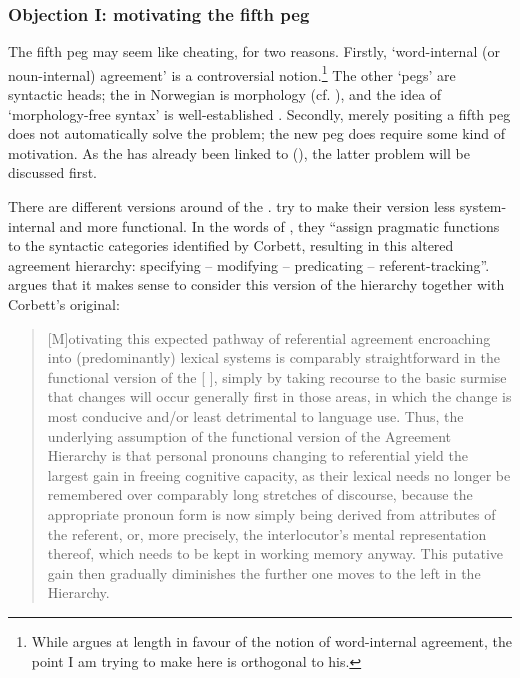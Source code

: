 \documentclass[output=paper]{langsci/langscibook}
\begin{document}
\begin{exe}
\begin{xlist}
\begin{xlist}
\subsubsection{Objection I: motivating the fifth peg}
\label{sec:enger:3.2.2}
\largerpage
The fifth peg may seem like cheating, for two reasons. Firstly,
`word-internal (or noun-internal) agreement' is a controversial
notion.\footnote{While %
\citet{Stolz07} %
%
argues at length in favour of the
  notion of word-internal agreement, the point I am trying to make here
  is orthogonal to his.} The other `pegs' are syntactic heads; the
 in Norwegian is morphology (cf. ), and the idea of
`morphology-free syntax' is well-established %
\citep{Zwicky92,Corbett14}%
%
. Secondly, merely positing a fifth peg does not automatically
solve the problem; the new peg does require some kind of motivation. As
the  has already been linked to 
(), the latter problem will be discussed first.

There are different versions around of the . %
\citet{Kopcke10} %
%
try to make their version less system-internal and more
functional. In the words of %
\citet[18]{Dolberg14}%
%
, they ``assign pragmatic
functions to the syntactic categories identified by Corbett, resulting
in this altered agreement hierarchy: specifying -- modifying --
predicating -- referent-tracking''. %
\citet[58]{Dolberg14} %
%
argues that it
makes sense to consider this version of the hierarchy together with
Corbett's original:

\begin{quote}
[M]otivating this expected pathway of referential agreement encroaching
into (predominantly) lexical  systems is comparably
straightforward in the functional version of the 
{[}%
\citealt{Kopcke10}%
%
{]}, simply by taking recourse to the basic surmise
that changes will occur generally first in those areas, in which the
change is most conducive and/or least detrimental to language use. Thus,
the underlying assumption of the functional version of the Agreement
Hierarchy is that personal pronouns changing to referential  yield
the largest gain in freeing cognitive capacity, as their lexical 
needs no longer be remembered over comparably long stretches of
discourse, because the appropriate pronoun form is now simply being
derived from attributes of the referent, or, more precisely, the
interlocutor's mental representation thereof, which needs to be kept in
working memory anyway. This putative gain then gradually diminishes the
further one moves to the left in the Hierarchy. %
\citep[58]{Dolberg14}%
%


\end{quote}
\end{xlist}
\end{xlist}
\end{exe}
\end{document}

